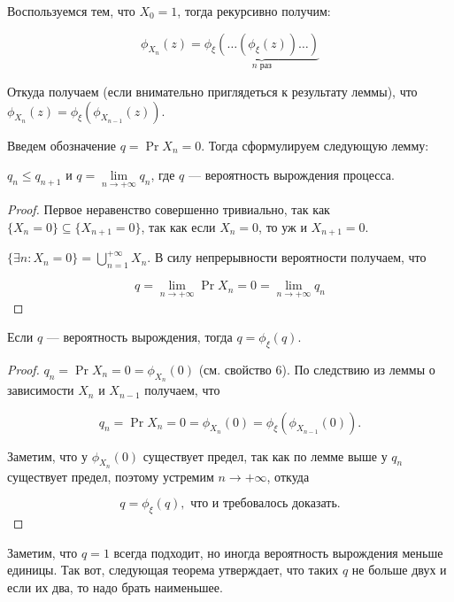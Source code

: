 \begin{consequence}
  Воспользуемся тем, что $X_0 = 1$, тогда рекурсивно получим:

  \[
    \phi_{X_n}(z) = \underbrace{\phi_{\xi}(\ldots(\phi_{\xi}(z))\ldots)}_{n \text{ раз}}
  \]

  Откуда получаем (если внимательно приглядеться к результату леммы),
  что $\phi_{X_n}(z) = \phi_{\xi}(\phi_{X_{n - 1}}(z))$.
\end{consequence}

Введем обозначение $q = \Pr{X_n = 0}$. Тогда сформулируем следующую лемму:

\begin{lemma}
  $q_n \leq q_{n + 1}$ и $q = \lim\limits_{n \to +\infty} q_n$, где $q$ --- вероятность
  вырождения процесса.
\end{lemma}

\begin{proof}
  Первое неравенство совершенно тривиально, так как $\{X_n = 0\} \subseteq 
  \{X_{n + 1} = 0\}$, так как если $X_n = 0$, то уж и $X_{n + 1} = 0$.

  $\{\exists n: X_n = 0\} = \bigcup\limits_{n = 1}^{+\infty} X_n$. В силу
  непрерывности вероятности получаем, что

  \[
    q = \lim\limits_{n \to +\infty} \Pr{X_n = 0} = \lim\limits_{n \to +\infty}
    q_n
  \]
\end{proof}

\begin{theorem}
  Если $q$ --- вероятность вырождения, тогда $q = \phi_{\xi}(q)$.
\end{theorem}

\begin{proof}
  $q_n = \Pr{X_n = 0} = \phi_{X_n}(0)$ (см. свойство 6). По следствию
  из леммы о зависимости $X_n$ и $X_{n - 1}$ получаем, что

  \[
    q_n = \Pr{X_n = 0} = \phi_{X_n}(0) = \phi_{\xi}(\phi_{X_{n - 1}}(0)).
  \]

  Заметим, что у $\phi_{X_n}(0)$ существует предел, так как по лемме выше у
  $q_n$ существует предел, поэтому устремим $n \to +\infty$, откуда

  \[
    q = \phi_{\xi}(q), \text{ что и требовалось доказать.}
  \]
\end{proof}

Заметим, что $q = 1$
всегда подходит, но иногда вероятность вырождения меньше единицы. Так вот, следующая
теорема утверждает, что таких $q$ не больше двух и если их два, то надо брать
наименьшее.


